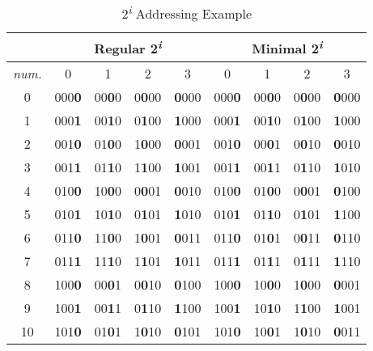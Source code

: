 \begin{table}[H]
  \caption{2\textsuperscript{\textit{i}} Addressing Example}
  \centering
  \begin{tabular}{|c||c|c|c|c||c|c|c|c|}
  \hline
    \multicolumn{1}{|c||}{} & 
    \multicolumn{4}{|c||}{Regular 2\textsuperscript{\textit{i}}} &
    \multicolumn{4}{|c|}{Minimal 2\textsuperscript{\textit{i}}} \\
  \hline
   \textit{num.}&  0 &             1 &             2 &             3 &             0 &             1 &             2 &             3 \\
   \hline
   0 & 000\textbf{0} & 00\textbf{0}0 & 0\textbf{0}00 & \textbf{0}000 & 000\textbf{0} & 00\textbf{0}0 & 0\textbf{0}00 & \textbf{0}000 \\  
   1 & 000\textbf{1} & 00\textbf{1}0 & 0\textbf{1}00 & \textbf{1}000 & 000\textbf{1} & 00\textbf{1}0 & 0\textbf{1}00 & \textbf{1}000 \\  
   2 & 001\textbf{0} & 01\textbf{0}0 & 1\textbf{0}00 & \textbf{0}001 & 001\textbf{0} & 00\textbf{0}1 & 0\textbf{0}10 & \textbf{0}010 \\  
   3 & 001\textbf{1} & 01\textbf{1}0 & 1\textbf{1}00 & \textbf{1}001 & 001\textbf{1} & 00\textbf{1}1 & 0\textbf{1}10 & \textbf{1}010 \\  
   \hline                                                                          
   4 & 010\textbf{0} & 10\textbf{0}0 & 0\textbf{0}01 & \textbf{0}010 & 010\textbf{0} & 01\textbf{0}0 & 0\textbf{0}01 & \textbf{0}100 \\  
   5 & 010\textbf{1} & 10\textbf{1}0 & 0\textbf{1}01 & \textbf{1}010 & 010\textbf{1} & 01\textbf{1}0 & 0\textbf{1}01 & \textbf{1}100 \\  
   6 & 011\textbf{0} & 11\textbf{0}0 & 1\textbf{0}01 & \textbf{0}011 & 011\textbf{0} & 01\textbf{0}1 & 0\textbf{0}11 & \textbf{0}110 \\  
   7 & 011\textbf{1} & 11\textbf{1}0 & 1\textbf{1}01 & \textbf{1}011 & 011\textbf{1} & 01\textbf{1}1 & 0\textbf{1}11 & \textbf{1}110 \\  
   \hline                                                                          
   8 & 100\textbf{0} & 00\textbf{0}1 & 0\textbf{0}10 & \textbf{0}100 & 100\textbf{0} & 10\textbf{0}0 & 1\textbf{0}00 & \textbf{0}001 \\  
   9 & 100\textbf{1} & 00\textbf{1}1 & 0\textbf{1}10 & \textbf{1}100 & 100\textbf{1} & 10\textbf{1}0 & 1\textbf{1}00 & \textbf{1}001 \\  
  10 & 101\textbf{0} & 01\textbf{0}1 & 1\textbf{0}10 & \textbf{0}101 & 101\textbf{0} & 10\textbf{0}1 & 1\textbf{0}10 & \textbf{0}011 \\  

\end{tabular}
\end{table}
